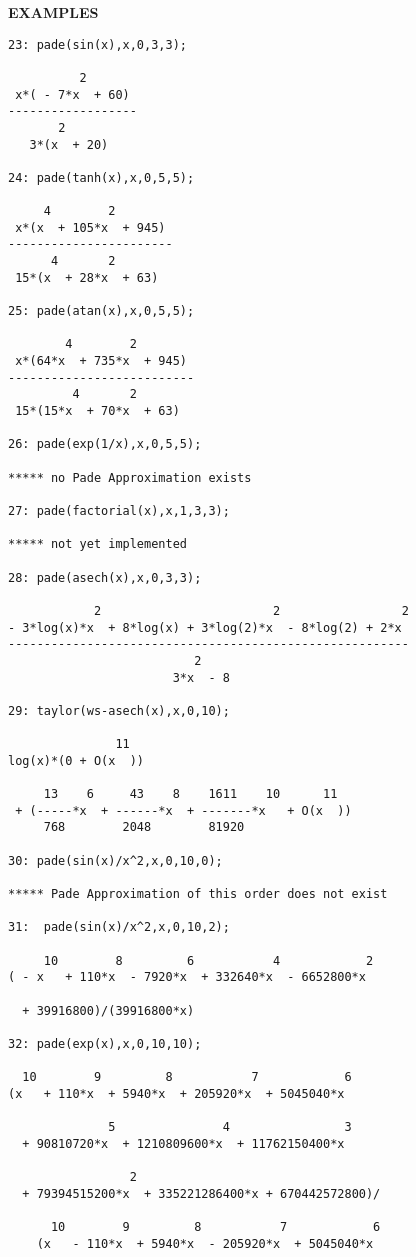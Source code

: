 {\large\textbf{EXAMPLES}}

\begin{verbatim}
23: pade(sin(x),x,0,3,3);

          2
 x*( - 7*x  + 60)
------------------
       2
   3*(x  + 20)

24: pade(tanh(x),x,0,5,5);

     4        2
 x*(x  + 105*x  + 945)
-----------------------
      4       2
 15*(x  + 28*x  + 63)

25: pade(atan(x),x,0,5,5);

        4        2
 x*(64*x  + 735*x  + 945)
--------------------------
         4       2
 15*(15*x  + 70*x  + 63)

26: pade(exp(1/x),x,0,5,5);

***** no Pade Approximation exists

27: pade(factorial(x),x,1,3,3);

***** not yet implemented

28: pade(asech(x),x,0,3,3);

            2                        2                 2
- 3*log(x)*x  + 8*log(x) + 3*log(2)*x  - 8*log(2) + 2*x
--------------------------------------------------------
                          2
                       3*x  - 8

29: taylor(ws-asech(x),x,0,10);

               11
log(x)*(0 + O(x  ))

     13    6     43    8    1611    10      11
 + (-----*x  + ------*x  + -------*x   + O(x  ))
     768        2048        81920

30: pade(sin(x)/x^2,x,0,10,0);

***** Pade Approximation of this order does not exist

31:  pade(sin(x)/x^2,x,0,10,2);

     10        8         6           4            2
( - x   + 110*x  - 7920*x  + 332640*x  - 6652800*x

  + 39916800)/(39916800*x)

32: pade(exp(x),x,0,10,10);

  10        9         8           7            6
(x   + 110*x  + 5940*x  + 205920*x  + 5045040*x

              5               4                3
  + 90810720*x  + 1210809600*x  + 11762150400*x

                 2
  + 79394515200*x  + 335221286400*x + 670442572800)/

      10        9         8           7            6
    (x   - 110*x  + 5940*x  - 205920*x  + 5045040*x


\end{verbatim}
